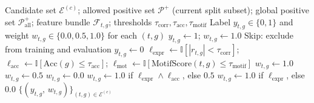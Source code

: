 \documentclass{article}
\begin{document}
\begin{algorithm}[H]
\caption{Split-Safe Label and Sample-Weight Assignment}
\label{alg:splits}
\begin{algorithmic}[1]
\Require Candidate set $\mathcal{E}^{(c)}$;
         allowed positive set $\mathcal{P}^{+}$ (current split subset);
         global positive set $\mathcal{P}^{+}_{\mathrm{all}}$;
         feature bundle $\mathcal{F}_{t,g}$;
         thresholds $\tau_{\mathrm{corr}}, \tau_{\mathrm{acc}}, \tau_{\mathrm{motif}}$
\Ensure  Label $y_{t,g} \in \{0,1\}$ and weight $w_{t,g} \in \{0.0, 0.5, 1.0\}$ for each $(t,g)$
    \State $y_{t,g} \leftarrow 1$;\; $w_{t,g} \leftarrow 1.0$
    \State Skip: exclude from training and evaluation
  \Else
    \State $y_{t,g} \leftarrow 0$
    \State $\ell_{\mathrm{expr}} \leftarrow \mathbb{I}[|r_{t,g}| < \tau_{\mathrm{corr}}]$;\;
           $\ell_{\mathrm{acc}} \leftarrow \mathbb{I}[\mathrm{Acc}(g) \le \tau_{\mathrm{acc}}]$;\;
           $\ell_{\mathrm{mot}} \leftarrow \mathbb{I}[\mathrm{MotifScore}(t,g) \le \tau_{\mathrm{motif}}]$
        \State $w_{t,g} \leftarrow 1.0$ 
        \State $w_{t,g} \leftarrow 0.5$ 
      \Else
        \State $w_{t,g} \leftarrow 0.0$ 
      \EndIf
      \State $w_{t,g} \leftarrow 1.0$ if $\ell_{\mathrm{expr}} \wedge \ell_{\mathrm{acc}}$, else $0.5$
    \Else
      \State $w_{t,g} \leftarrow 1.0$ if $\ell_{\mathrm{expr}}$, else $0.0$
    \EndIf
  \EndIf
\EndFor
\State \Return $\{(y_{t,g},\, w_{t,g})\}_{(t,g) \in \mathcal{E}^{(c)}}$
\end{algorithmic}
\end{algorithm}
\end{document}
